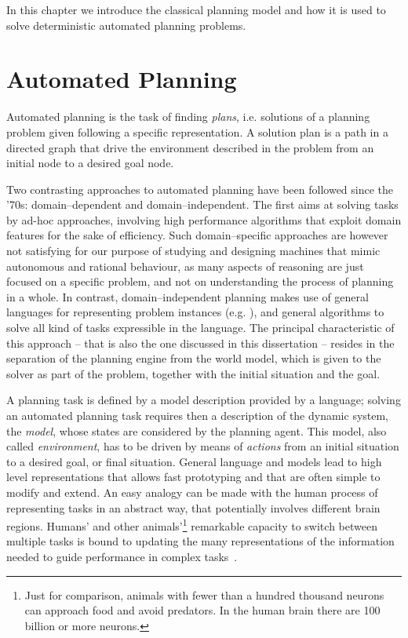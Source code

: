 In this chapter we introduce the classical planning model
 and how it is used to solve deterministic automated planning  problems.
%

\section{Automated Planning}

Automated planning is the task of finding \emph{plans}, i.e. solutions of a planning problem given following a specific representation.
A solution plan is a path in a directed graph that drive the environment described in the problem
from an initial node to a desired goal node.
%

Two contrasting approaches to automated planning have been followed
since the '70s: domain--dependent and
domain--independent.
%
The first aims at solving tasks by ad-hoc approaches, involving
high performance algorithms that exploit domain features for the sake of efficiency.
Such domain--specific approaches are however not satisfying for our purpose of studying and designing machines that mimic autonomous and rational behaviour, as many aspects of reasoning are just focused on a specific problem, and not on understanding the process of planning in a whole. 
%
In contrast, domain--independent planning makes use of
general languages for representing problem instances (e.g. \pddl), and
general algorithms to solve all kind of tasks
expressible in the language.  The principal characteristic of this
approach -- that is also the one
discussed in this dissertation -- resides in the separation of the planning engine from the
world model, which is given to the solver as part of the problem,
together with the initial situation and the goal.
%

A planning task is defined by a model description provided by a
language; solving an automated planning task requires then a
description of the dynamic system, the \emph{model}, whose states are
considered by the planning agent.  This model, also called 
\emph{environment}, has to be driven by means of \emph{actions} from
an initial situation to a desired goal, or final situation.
%
General language and models
lead to high level representations that
allows fast prototyping and that are often simple to modify and extend.
%
An easy analogy can be made with the human process of 
representing tasks in an abstract way,
that potentially involves different brain regions.  Humans' and other
animals'\footnote{Just for comparison, animals with fewer than a
  hundred thousand neurons can approach food and avoid predators. In
  the human brain there are 100 billion or more neurons.} remarkable
capacity to switch between multiple tasks is bound to updating the
many representations of the information needed to guide performance in
complex tasks~\citep{miller:PFC, wouter:brain}.





